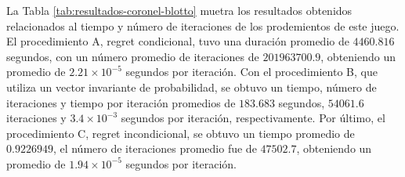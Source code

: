 La Tabla \ref{tab:resultados-coronel-blotto} muetra los resultados obtenidos relacionados al tiempo y número de iteraciones de los prodemientos de este juego. El procedimiento A, regret condicional, tuvo una duración promedio de $4460.816$ segundos, con un número promedio de iteraciones de $201963700.9$, obteniendo un promedio de $2.21 {\times} 10^{-5}$ segundos por iteración. Con el procedimiento B, que utiliza un vector invariante de probabilidad, se obtuvo un tiempo, número de iteraciones y tiempo por iteración promedios de $183.683$ segundos, $54061.6$ iteraciones y $3.4 {\times} 10^{-3}$ segundos por iteración, respectivamente. Por último, el procedimiento C, regret incondicional, se obtuvo un tiempo promedio de $0.9226949$, el número de iteraciones promedio fue de $47502.7$, obteniendo un promedio de $1.94 {\times} 10^{-5}$ segundos por iteración.

